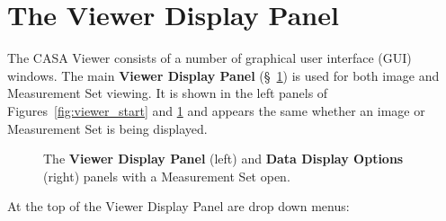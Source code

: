
\section{The Viewer Display Panel}
\label{section:display.viewerGUI.displaypanel}

The CASA Viewer consists of a number of graphical user interface (GUI) windows.
The main {\bf Viewer Display Panel} (\S~\ref{section:display.viewerGUI.displaypanel})
is used for both image and Measurement Set viewing. It is shown in the left panels of 
Figures~\ref{fig:viewer_start} and \ref{fig:viewer_start_ms} and appears the same whether 
an image or Measurement Set is being displayed.

\begin{figure}[h!]
\begin{center}
\caption{\label{fig:viewer_start_ms} The {\bf Viewer Display Panel}
(left) and {\bf Data Display Options} (right) panels with a Measurement Set open.} 
\hrulefill
\end{center}
\end{figure}


At the top of the Viewer Display Panel are drop down menus:

